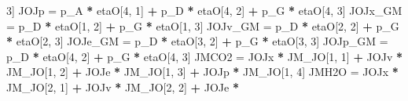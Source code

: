 \documentclass[]{article}
\newenvironment{Shaded}{\begin{snugshade}}{\end{snugshade}}
\newcommand{\DecValTok}[1]{\textcolor[rgb]{0.00,0.00,0.81}{#1}}
\newcommand{\StringTok}[1]{\textcolor[rgb]{0.31,0.60,0.02}{#1}}
\newcommand{\OperatorTok}[1]{\textcolor[rgb]{0.81,0.36,0.00}{\textbf{#1}}}
\newcommand{\NormalTok}[1]{#1}
\begin{document}
\begin{Shaded}
\begin{Highlighting}[]
{{{        \DecValTok{3}\NormalTok{]}
\NormalTok{    JOJp =}\StringTok{ }\NormalTok{p_A }\OperatorTok{*}\StringTok{ }\NormalTok{etaO[}\DecValTok{4}\NormalTok{, }\DecValTok{1}\NormalTok{] }\OperatorTok{+}\StringTok{ }\NormalTok{p_D }\OperatorTok{*}\StringTok{ }\NormalTok{etaO[}\DecValTok{4}\NormalTok{, }\DecValTok{2}\NormalTok{] }\OperatorTok{+}\StringTok{ }\NormalTok{p_G }\OperatorTok{*}\StringTok{ }\NormalTok{etaO[}\DecValTok{4}\NormalTok{, }
        \DecValTok{3}\NormalTok{]}
\NormalTok{    JOJx_GM =}\StringTok{ }\NormalTok{p_D }\OperatorTok{*}\StringTok{ }\NormalTok{etaO[}\DecValTok{1}\NormalTok{, }\DecValTok{2}\NormalTok{] }\OperatorTok{+}\StringTok{ }\NormalTok{p_G }\OperatorTok{*}\StringTok{ }\NormalTok{etaO[}\DecValTok{1}\NormalTok{, }\DecValTok{3}\NormalTok{]}
\NormalTok{    JOJv_GM =}\StringTok{ }\NormalTok{p_D }\OperatorTok{*}\StringTok{ }\NormalTok{etaO[}\DecValTok{2}\NormalTok{, }\DecValTok{2}\NormalTok{] }\OperatorTok{+}\StringTok{ }\NormalTok{p_G }\OperatorTok{*}\StringTok{ }\NormalTok{etaO[}\DecValTok{2}\NormalTok{, }\DecValTok{3}\NormalTok{]}
\NormalTok{    JOJe_GM =}\StringTok{ }\NormalTok{p_D }\OperatorTok{*}\StringTok{ }\NormalTok{etaO[}\DecValTok{3}\NormalTok{, }\DecValTok{2}\NormalTok{] }\OperatorTok{+}\StringTok{ }\NormalTok{p_G }\OperatorTok{*}\StringTok{ }\NormalTok{etaO[}\DecValTok{3}\NormalTok{, }\DecValTok{3}\NormalTok{]}
\NormalTok{    JOJp_GM =}\StringTok{ }\NormalTok{p_D }\OperatorTok{*}\StringTok{ }\NormalTok{etaO[}\DecValTok{4}\NormalTok{, }\DecValTok{2}\NormalTok{] }\OperatorTok{+}\StringTok{ }\NormalTok{p_G }\OperatorTok{*}\StringTok{ }\NormalTok{etaO[}\DecValTok{4}\NormalTok{, }\DecValTok{3}\NormalTok{]}
\NormalTok{    JMCO2 =}\StringTok{ }\NormalTok{JOJx }\OperatorTok{*}\StringTok{ }\NormalTok{JM_JO[}\DecValTok{1}\NormalTok{, }\DecValTok{1}\NormalTok{] }\OperatorTok{+}\StringTok{ }\NormalTok{JOJv }\OperatorTok{*}\StringTok{ }\NormalTok{JM_JO[}\DecValTok{1}\NormalTok{, }\DecValTok{2}\NormalTok{] }\OperatorTok{+}\StringTok{ }\NormalTok{JOJe }\OperatorTok{*}\StringTok{ }
\StringTok{        }\NormalTok{JM_JO[}\DecValTok{1}\NormalTok{, }\DecValTok{3}\NormalTok{] }\OperatorTok{+}\StringTok{ }\NormalTok{JOJp }\OperatorTok{*}\StringTok{ }\NormalTok{JM_JO[}\DecValTok{1}\NormalTok{, }\DecValTok{4}\NormalTok{]}
\NormalTok{    JMH2O =}\StringTok{ }\NormalTok{JOJx }\OperatorTok{*}\StringTok{ }\NormalTok{JM_JO[}\DecValTok{2}\NormalTok{, }\DecValTok{1}\NormalTok{] }\OperatorTok{+}\StringTok{ }\NormalTok{JOJv }\OperatorTok{*}\StringTok{ }\NormalTok{JM_JO[}\DecValTok{2}\NormalTok{, }\DecValTok{2}\NormalTok{] }\OperatorTok{+}\StringTok{ }\NormalTok{JOJe }\OperatorTok{*}\StringTok{ }
}}}
\end{Highlighting}
\end{Shaded}
\end{document}

